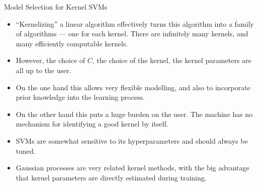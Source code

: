 \documentclass[11pt,compress,t,notes=noshow, xcolor=table]{beamer}
\begin{document}

\begin{vbframe}{Model Selection for Kernel SVMs}
    \begin{itemize}
    \item \enquote{Kernelizing} a linear algorithm effectively turns this
    algorithm into a family of algorithms --- one for each
    kernel. There are infinitely many kernels, and many
    efficiently computable kernels.
    \item However, the choice of $C$, the choice of the kernel, the kernel parameters
      are all up to the user.
    \item On the one hand this allows very flexible modelling, and also to 
      incorporate prior knowledge into the learning process. 
    \item On the other hand this puts a huge burden on the user. 
      The machine has no mechanism for identifying a good
    kernel by itself.
    \item SVMs are somewhat sensitive to its hyperparameters and should always 
      be tuned.
  \item Gaussian processes are very related kernel methods, with the big advantage that kernel parameters are directly estimated during training.
  \end{itemize}
\end{vbframe}
\end{document}
